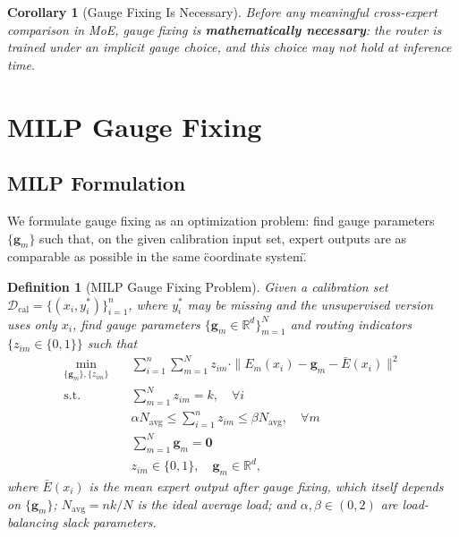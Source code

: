 \documentclass[12pt,a4paper]{article}
\newtheorem{corollary}[theorem]{Corollary}
\newtheorem{definition}[theorem]{Definition}
\theoremstyle{remark}
\newcommand{\R}{\mathbb{R}}
\newcommand{\D}{\mathcal{D}}
\begin{document}
\begin{corollary}[Gauge Fixing Is Necessary]\label{cor:necessity}
Before any meaningful cross-expert comparison in MoE, gauge fixing is \textbf{mathematically necessary}: the router is trained under an implicit gauge choice, and this choice may not hold at inference time.
\end{corollary}

\section{MILP Gauge Fixing}

\subsection{MILP Formulation}

We formulate gauge fixing as an optimization problem: find gauge parameters $\{\mathbf{g}_m\}$ such that, on the given calibration input set, expert outputs are as comparable as possible in the same \"coordinate system\".

\begin{definition}[MILP Gauge Fixing Problem]\label{def:milp_gf}
Given a calibration set $\D_{\text{cal}} = \{(x_i, y_i^*)\}_{i=1}^{n}$, where $y_i^*$ may be missing and the unsupervised version uses only $x_i$, find gauge parameters $\{\mathbf{g}_m \in \R^d\}_{m=1}^N$ and routing indicators $\{z_{im} \in \{0,1\}\}$ such that
\begin{align}
    \min_{\{\mathbf{g}_m\}, \{z_{im}\}} \quad & \sum_{i=1}^{n} \sum_{m=1}^{N} z_{im} \cdot \|E_m(x_i) - \mathbf{g}_m - \bar{E}(x_i)\|^2 \label{eq:milp_obj} \\
    \text{s.t.} \quad & \sum_{m=1}^{N} z_{im} = k, \quad \forall i \label{eq:milp_topk} \\
    & \alpha N_{\text{avg}} \leq \sum_{i=1}^{n} z_{im} \leq \beta N_{\text{avg}}, \quad \forall m \label{eq:milp_balance} \\
    & \sum_{m=1}^{N} \mathbf{g}_m = \mathbf{0} \label{eq:milp_zero} \\
    & z_{im} \in \{0, 1\}, \quad \mathbf{g}_m \in \R^d, \label{eq:milp_domain}
\end{align}
where $\bar{E}(x_i)$ is the mean expert output after gauge fixing, which itself depends on $\{\mathbf{g}_m\}$; $N_{\text{avg}} = nk/N$ is the ideal average load; and $\alpha, \beta \in (0, 2)$ are load-balancing slack parameters.
\end{definition}
\end{document}
